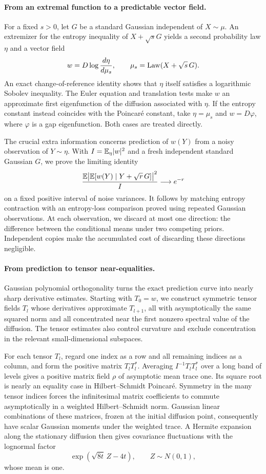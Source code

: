 \paragraph{From an extremal function to a predictable vector field.}
For a fixed \(s>0\), let \(G\) be a standard Gaussian independent of
\(X\sim\mu\).  An extremizer for the entropy inequality of
\(X+\sqrt sG\) yields a second probability law
\(\eta\) and a vector field
\[
 w=D\log\frac{d\eta}{d\mu_s},
 \qquad \mu_s=\operatorname{Law}(X+\sqrt s\,G).
\]
An exact change-of-reference identity shows that \(\eta\) itself
satisfies a logarithmic Sobolev inequality.
The Euler equation and translation tests make \(w\) an approximate
first eigenfunction of the diffusion associated with \(\eta\).
If the entropy constant instead coincides with the Poincar\'e
constant, take \(\eta=\mu_s\) and \(w=D\varphi\), where
\(\varphi\) is a gap eigenfunction.  Both cases are treated directly.

The crucial extra information concerns prediction of \(w(Y)\) from
a noisy observation of \(Y\sim\eta\).  With
\(I=\mathbb E_\eta|w|^2\) and a fresh independent standard Gaussian \(G\),
we prove the limiting identity
\[
 \frac{\mathbb E\big|\mathbb E[w(Y)\mid Y+\sqrt r\,G]\big|^2}{I}
 \longrightarrow e^{-r}
\]
on a fixed positive interval of noise variances.
It follows by matching entropy contraction with an entropy-loss
comparison proved using repeated Gaussian observations.
At each observation, we discard at most one direction: the difference
between the conditional means under two competing priors.
Independent copies make the accumulated cost of discarding these
directions negligible.

\paragraph{From prediction to tensor near-equalities.}
Gaussian polynomial orthogonality turns the exact prediction curve
into nearly sharp derivative estimates.
Starting with \(T_0=w\), we construct symmetric tensor fields \(T_l\)
whose derivatives approximate \(T_{l+1}\), all with asymptotically the
same squared norm and all concentrated near the first nonzero spectral value
of the diffusion.  The tensor estimates also control curvature and
exclude concentration in the relevant small-dimensional subspaces.

For each tensor \(T_l\), regard one index as a row and all remaining
indices as a column, and form the positive matrix \(T_lT_l^*\).
Averaging \(I^{-1}T_lT_l^*\) over a long band of levels gives a
positive matrix field \(\rho\) of asymptotic mean trace one.  Its square root is nearly an equality case in
Hilbert--Schmidt Poincar\'e.  Symmetry in the many tensor indices
forces the infinitesimal matrix coefficients to commute
asymptotically in a weighted Hilbert--Schmidt norm.  Gaussian linear combinations of these matrices, frozen at the initial
diffusion point, consequently have scalar Gaussian moments under the
weighted trace.  A Hermite expansion along the stationary diffusion
then gives covariance fluctuations with the lognormal factor
\[
 \exp(\sqrt{8t}\,Z-4t),\qquad Z\sim N(0,1),
\]
whose mean is one.

